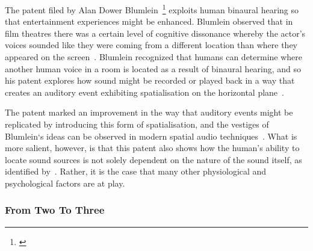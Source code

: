 The patent filed by Alan Dower Blumlein~\footnote{\citep{blumlein-patent}} exploits human binaural hearing so that entertainment experiences might be enhanced.
Blumlein observed that in film theatres there was a certain level of cognitive dissonance whereby the actor’s voices sounded like they were coming from a different location than where they appeared on the screen~\citep{alexander_blumlein}.
Blumlein recognized that humans can determine where another human voice in a room is located as a result of binaural hearing, and so his patent explores how sound might be recorded or played back in a way that creates an auditory event exhibiting spatialisation on the horizontal plane~\citep{blumlein-patent}.

The patent marked an improvement in the way that auditory events might be replicated by introducing this form of spatialisation, and the vestiges of Blumlein`s ideas can be observed in modern spatial audio techniques~\citep{politis_spatial, beyer_acoustics}.
What is more salient, however, is that this patent also shows how the human’s ability to locate sound sources is not solely dependent on the nature of the sound itself, as identified by~\citet{blauert_spatial}.
Rather, it is the case that many other physiological and psychological factors are at play.

\subsubsection{From Two To Three}

